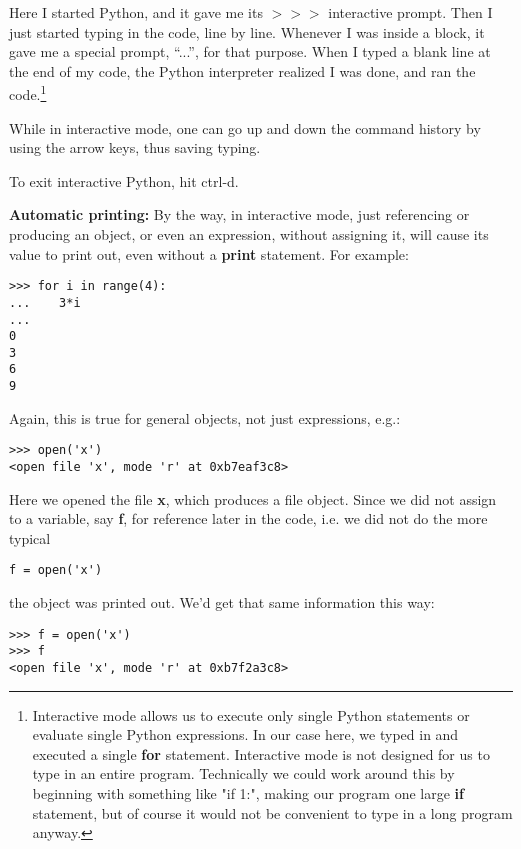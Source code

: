 Here I started Python, and it gave me its $>>>$ interactive prompt.
Then I just started typing in the code, line by line.  Whenever I was
inside a block, it gave me a special prompt, ``...'', for that purpose.
When I typed a blank line at the end of my code, the Python interpreter
realized I was done, and ran the code.\footnote{Interactive mode allows
us to execute only single Python statements or evaluate single Python
expressions.  In our case here, we typed in and executed a single {\bf
for} statement.  Interactive mode is not designed for us to type in an
entire program.  Technically we could work around this by beginning with
something like "if 1:", making our program one large {\bf if} statement,
but of course it would not be convenient to type in a long program
anyway.}

While in interactive mode, one can go up and down the command history by
using the arrow keys, thus saving typing.

To exit interactive Python, hit ctrl-d.

{\bf Automatic printing:} By the way, in interactive mode, just
referencing or producing an object, or even an expression, without
assigning it, will cause its value to print out, even without a {\bf
print} statement.  For example:

\begin{Verbatim}[fontsize=\relsize{-2}]
>>> for i in range(4):
...    3*i
...
0
3
6
9
\end{Verbatim}

Again, this is true for general objects, not just expressions, e.g.:

\begin{Verbatim}[fontsize=\relsize{-2}]
>>> open('x')
<open file 'x', mode 'r' at 0xb7eaf3c8>
\end{Verbatim}

Here we opened the file {\bf x}, which produces a file object.  Since we
did not assign to a variable, say {\bf f}, for reference later in the
code, i.e. we did not do the more typical

\begin{Verbatim}[fontsize=\relsize{-2}]
f = open('x')
\end{Verbatim}

the object was printed out.  We'd get that same information this way:

\begin{Verbatim}[fontsize=\relsize{-2}]
>>> f = open('x')
>>> f
<open file 'x', mode 'r' at 0xb7f2a3c8>
\end{Verbatim}

